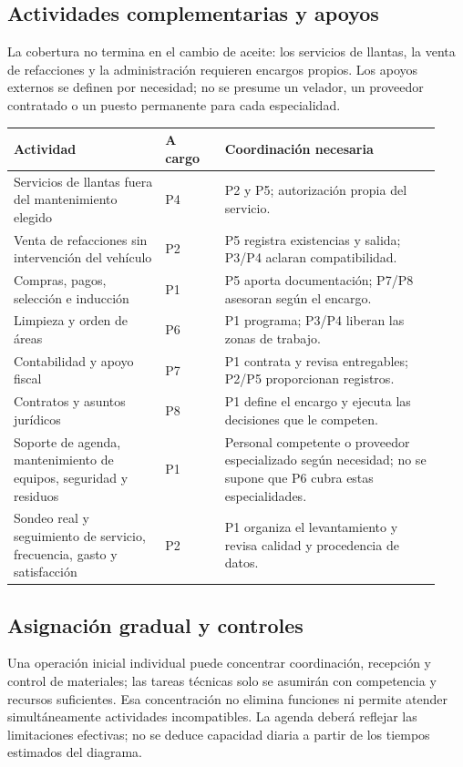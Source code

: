 {\subsection{Actividades complementarias y apoyos}
La cobertura no termina en el cambio de aceite: los servicios de llantas, la venta de refacciones y la administración requieren encargos propios. Los apoyos externos se definen por necesidad; no se presume un velador, un proveedor contratado o un puesto permanente para cada especialidad.


{\small\renewcommand{\arraystretch}{1.15}\begin{longtable}{@{}p{0.33\linewidth}p{0.13\linewidth}p{0.47\linewidth}@{}}
\toprule \textbf{Actividad} & \textbf{A cargo} & \textbf{Coordinación necesaria} \\ \midrule\endhead
Servicios de llantas fuera del mantenimiento elegido & P4 & P2 y P5; autorización propia del servicio. \\ \midrule
Venta de refacciones sin intervención del vehículo & P2 & P5 registra existencias y salida; P3/P4 aclaran compatibilidad. \\ \midrule
Compras, pagos, selección e inducción & P1 & P5 aporta documentación; P7/P8 asesoran según el encargo. \\ \midrule
Limpieza y orden de áreas & P6 & P1 programa; P3/P4 liberan las zonas de trabajo. \\ \midrule
Contabilidad y apoyo fiscal & P7 & P1 contrata y revisa entregables; P2/P5 proporcionan registros. \\ \midrule
Contratos y asuntos jurídicos & P8 & P1 define el encargo y ejecuta las decisiones que le competen. \\ \midrule
Soporte de agenda, mantenimiento de equipos, seguridad y residuos & P1 & Personal competente o proveedor especializado según necesidad; no se supone que P6 cubra estas especialidades. \\ \midrule
Sondeo real y seguimiento de servicio, frecuencia, gasto y satisfacción & P2 & P1 organiza el levantamiento y revisa calidad y procedencia de datos. \\ \midrule
\end{longtable}}
\subsection{Asignación gradual y controles}
Una operación inicial individual puede concentrar coordinación, recepción y control de materiales; las tareas técnicas solo se asumirán con competencia y recursos suficientes. Esa concentración no elimina funciones ni permite atender simultáneamente actividades incompatibles. La agenda deberá reflejar las limitaciones efectivas; no se deduce capacidad diaria a partir de los tiempos estimados del diagrama.


}
